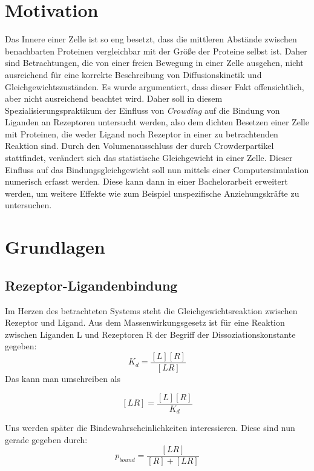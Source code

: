 \documentclass[bachelor,       %
               twoside,        %
               BCOR10mm,       %
               english,ngerman, %
               ]{GAUBM}
\begin{document}
\mainmatter   %

\chapter{Motivation}
Das Innere einer Zelle ist so eng besetzt, dass die mittleren Abstände zwischen
benachbarten Proteinen vergleichbar mit der Größe der Proteine selbst ist.
Daher sind Betrachtungen, die von einer freien Bewegung in einer Zelle ausgehen,
nicht ausreichend für eine korrekte Beschreibung von Diffusionskinetik und Gleichgewichtszuständen.
Es wurde argumentiert, dass dieser Fakt offensichtlich, aber nicht ausreichend
beachtet wird\cite{ellis}.
Daher soll in diesem Spezialisierungspraktikum der Einfluss von \emph{Crowding} auf die Bindung
von Liganden an Rezeptoren
untersucht werden, also dem dichten Besetzen einer Zelle mit Proteinen, die weder
Ligand noch Rezeptor in einer zu betrachtenden Reaktion sind. Durch den
Volumenausschluss der durch Crowderpartikel stattfindet, verändert sich das
statistische Gleichgewicht in einer Zelle. Dieser Einfluss auf das
Bindungsgleichgewicht soll nun mittels einer Computersimulation
numerisch erfasst werden. Diese kann dann in einer Bachelorarbeit erweitert werden,
um weitere Effekte wie zum Beispiel unspezifische Anziehungskräfte zu untersuchen.



\chapter{Grundlagen}
\section{Rezeptor-Ligandenbindung}
Im Herzen des betrachteten Systems steht die Gleichgewichtsreaktion zwischen
Rezeptor und Ligand. Aus dem Massenwirkungsgesetz ist für eine Reaktion zwischen Liganden
L und Rezeptoren R der Begriff der Dissoziationskonstante gegeben:
\begin{equation}
K_d = \frac{[L][R]}{[LR]}
\end{equation}
Das kann man umschreiben als

\begin{equation}
\label{er}
[LR] = \frac{[L][R]}{K_d}
\end{equation}

Uns werden später die Bindewahrscheinlichkeiten interessieren. Diese sind nun gerade gegeben durch:
\begin{equation}
p_{bound} = \frac{[LR]}{[R]+[LR]}
\end{equation}
\end{document}
